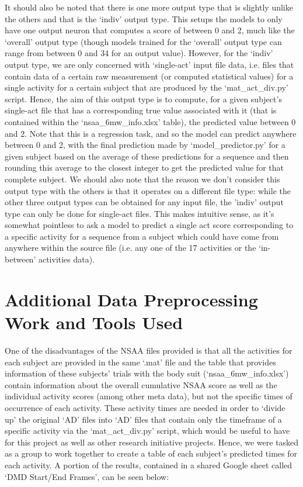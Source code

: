 \documentclass[12pt,twoside]{report}
\begin{document}
\quad It should also be noted that there is one more output type that is slightly unlike the others and that is the ‘indiv’ output type. This setups the models to only have one output neuron that computes a score of between 0 and 2, much like the ‘overall’ output type (though models trained for the ‘overall’ output type can range from between 0 and 34 for an output value). However, for the ‘indiv’ output type, we are only concerned with ‘single-act’ input file data, i.e. files that contain data of a certain raw measurement (or computed statistical values) for a single activity for a certain subject that are produced by the ‘mat\_act\_div.py’ script. Hence, the aim of this output type is to compute, for a given subject’s single-act file that has a corresponding true value associated with it (that is contained within the ‘nsaa\_6mw\_info.xlsx’ table), the predicted value between 0 and 2. Note that this is a regression task, and so the model can predict anywhere between 0 and 2, with the final prediction made by ‘model\_predictor.py’ for a given subject based on the average of these predictions for a sequence and then rounding this average to the closest integer to get the predicted value for that complete subject. We should also note that the reason we don’t consider this output type with the others is that it operates on a different file type: while the other three output types can be obtained for any input file, the 'indiv’ output type can only be done for single-act files. This makes intuitive sense, as it’s somewhat pointless to ask a model to predict a single act score corresponding to a specific activity for a sequence from a subject which could have come from anywhere within the source file (i.e. any one of the 17 activities or the ‘in-between’ activities data).


\section{Additional Data Preprocessing Work and Tools Used}

\quad One of the disadvantages of the NSAA files provided is that all the activities for each subject are provided in the same ‘.mat’ file and the table that provides information of these subjects’ trials with the body suit (‘nsaa\_6mw\_info.xlsx’) contain information about the overall cumulative NSAA score as well as the individual activity scores (among other meta data), but not the specific times of occurrence of each activity. These activity times are needed in order to ‘divide up’ the original ‘AD’ files into ‘AD’ files that contain only the timeframe of a specific activity via the ‘mat\_act\_div.py’ script, which would be useful to have for this project as well as other research initiative projects. Hence, we were tasked as a group to work together to create a table of each subject’s predicted times for each activity. A portion of the results, contained in a shared Google sheet called ‘DMD Start/End Frames’, can be seen below:
\end{document}
